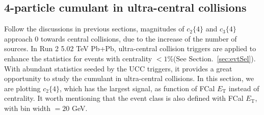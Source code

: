\subsection{4-particle cumulant in ultra-central collisions}
Follow the discussions in previous sections, magnitudes of $c_2\{4\}$ and $c_3\{4\}$ approach 0 towards central collisions, due to the increase of the number of sources. In Run 2 5.02 TeV Pb+Pb, ultra-central collision triggers are applied to enhance the statistics for events with centrality $<1\%$(See Section.~\ref{sec:evtSel}). With abundant statistics seeded by the UCC triggers, it provides a great opportunity to study the cumulant in ultra-central collisions. In this section, we are plotting $c_2\{4\}$, which has the largest signal, as function of FCal $E_\text{T}$ instead of centrality. It worth mentioning that the event class is also defined with FCal $E_\text{T}$, with bin width $=20$ GeV.

